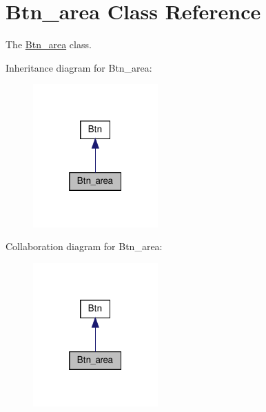 \hypertarget{classRET__config_1_1Btn__area}{}\section{Btn\+\_\+area Class Reference}
\label{classRET__config_1_1Btn__area}


The \hyperlink{classRET__config_1_1Btn__area}{Btn\+\_\+area} class.  




Inheritance diagram for Btn\+\_\+area\+:
\nopagebreak
\begin{figure}[H]
\begin{center}
\leavevmode
\includegraphics[width=136pt]{classRET__config_1_1Btn__area__inherit__graph}
\end{center}
\end{figure}


Collaboration diagram for Btn\+\_\+area\+:
\nopagebreak
\begin{figure}[H]
\begin{center}
\leavevmode
\includegraphics[width=136pt]{classRET__config_1_1Btn__area__coll__graph}
\end{center}
\end{figure}
